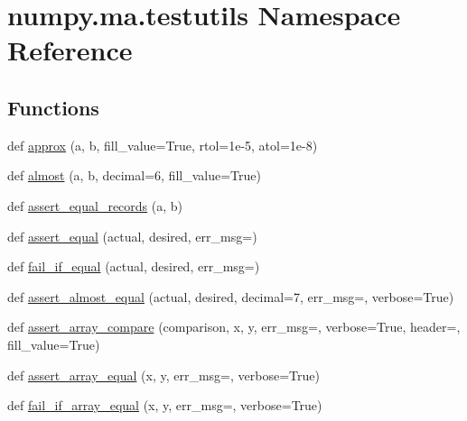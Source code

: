 \hypertarget{namespacenumpy_1_1ma_1_1testutils}{}\section{numpy.\+ma.\+testutils Namespace Reference}
\label{namespacenumpy_1_1ma_1_1testutils}
\subsection*{Functions}
\begin{DoxyCompactItemize}
\item 
def \hyperlink{namespacenumpy_1_1ma_1_1testutils_a63e89230b485a280aee83e841a57e320}{approx} (a, b, fill\+\_\+value=True, rtol=1e-\/5, atol=1e-\/8)
\item 
def \hyperlink{namespacenumpy_1_1ma_1_1testutils_a65073eb9423d35e7ff9024d5864a0181}{almost} (a, b, decimal=6, fill\+\_\+value=True)
\item 
def \hyperlink{namespacenumpy_1_1ma_1_1testutils_aa7a7a93a895fff7a36cb50c69caf225c}{assert\+\_\+equal\+\_\+records} (a, b)
\item 
def \hyperlink{namespacenumpy_1_1ma_1_1testutils_a612cf458d771647b91fcaeb3bc82f1e5}{assert\+\_\+equal} (actual, desired, err\+\_\+msg=\textquotesingle{}\textquotesingle{})
\item 
def \hyperlink{namespacenumpy_1_1ma_1_1testutils_abe23305ac24d44d355993629b3c83b28}{fail\+\_\+if\+\_\+equal} (actual, desired, err\+\_\+msg=\textquotesingle{}\textquotesingle{})
\item 
def \hyperlink{namespacenumpy_1_1ma_1_1testutils_a1d3b6577ce3b9428c1803d7d4cd53595}{assert\+\_\+almost\+\_\+equal} (actual, desired, decimal=7, err\+\_\+msg=\textquotesingle{}\textquotesingle{}, verbose=True)
\item 
def \hyperlink{namespacenumpy_1_1ma_1_1testutils_adf7ee5d1d3849b011141e565b24735ad}{assert\+\_\+array\+\_\+compare} (comparison, x, y, err\+\_\+msg=\textquotesingle{}\textquotesingle{}, verbose=True, header=\textquotesingle{}\textquotesingle{}, fill\+\_\+value=True)
\item 
def \hyperlink{namespacenumpy_1_1ma_1_1testutils_a3fc5e4393ebc1781a31f9a7300fedb6c}{assert\+\_\+array\+\_\+equal} (x, y, err\+\_\+msg=\textquotesingle{}\textquotesingle{}, verbose=True)
\item 
def \hyperlink{namespacenumpy_1_1ma_1_1testutils_abef9da4309066abec0dd9f382abe7c4f}{fail\+\_\+if\+\_\+array\+\_\+equal} (x, y, err\+\_\+msg=\textquotesingle{}\textquotesingle{}, verbose=True)

\end{DoxyCompactItemize}
